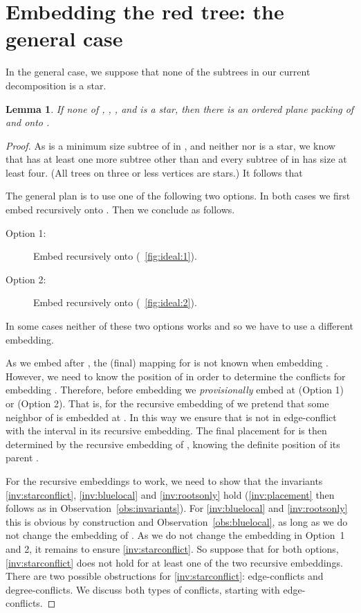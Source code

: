 \documentclass[11pt,a4paper,colorlinks=true,urlcolor=blue,citecolor=red]{article}
\theoremstyle{plain}
\newtheorem{lemma}[theorem]{Lemma}
\begin{document}
\section{Embedding the red tree: the general case}
\label{subsec:rec_general}
In the general case, we suppose that none of the subtrees in our current
decomposition is a star.
\begin{lemma}\label{lem:rec_general}
  If none of , , , and  is a star,
  then there is an ordered plane packing of  and  onto .
\end{lemma}
\begin{proof}
  As  is a minimum size subtree of  in , and neither  nor
   is a star, we know that  has at least one more subtree other
  than  and every subtree of  in  has size at least four. (All
  trees on three or less vertices are stars.) It follows that



  The general plan is to use one of the following two options. In both
  cases we first embed  recursively onto . Then we
  conclude as follows.
  \begin{description}
  \item[Option 1:] Embed  recursively onto 
    (\figurename~\ref{fig:ideal:1}).
  \item[Option 2:] Embed  recursively onto 
    (\figurename~\ref{fig:ideal:2}).
  \end{description}
  In some cases neither of these two options works and so we have to use
  a different embedding.

  As we embed  after , the (final) mapping for  is not known
  when embedding . However, we need to know the position of  in
  order to determine the conflicts for embedding . Therefore,
  before embedding  we \emph{provisionally} embed  at
   (Option 1) or
   (Option 2).  That
  is, for the recursive embedding of  we pretend that some neighbor
  of  is embedded at . In this way we ensure that  is not
  in edge-conflict with the interval in its recursive embedding.
The final placement for  is then determined by the recursive
  embedding of , knowing the definite position of its parent .

  For the recursive embeddings to work, we need to show that the
  invariants \ref{inv:starconflict}, \ref{inv:bluelocal} and
  \ref{inv:rootsonly} hold (\ref{inv:placement} then follows as in
  Observation~\ref{obs:invariants}). For \ref{inv:bluelocal} and
  \ref{inv:rootsonly} this is obvious by construction and
  Observation~\ref{obs:bluelocal}, as long as we do not change the
  embedding of . As we do not change the embedding in Option~1 and 2,
  it remains to ensure \ref{inv:starconflict}. So suppose that for both
  options, \ref{inv:starconflict} does not hold for at least one of the
  two recursive embeddings. There are two possible obstructions for
  \ref{inv:starconflict}: edge-conflicts and degree-conflicts. We
  discuss both types of conflicts, starting with edge-conflicts.


\end{proof}
\end{document}
